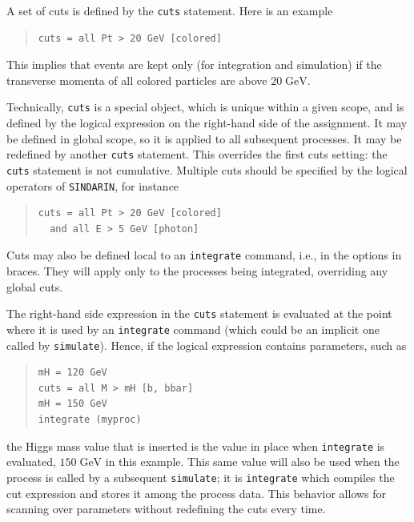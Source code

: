 \documentclass[12pt]{book}
\newcommand{\ttt}[1]{\texttt{#1}}
\newcommand{\sindarin}{\ttt{SINDARIN}}
\newcommand{\GeV}{\textrm{GeV}}
\begin{document}
A set of cuts is defined by the \ttt{cuts} statement.  Here is an example
\begin{quote}
\begin{footnotesize}
\begin{verbatim}
cuts = all Pt > 20 GeV [colored]
\end{verbatim}
\end{footnotesize}
\end{quote}
This implies that events are kept only (for integration and simulation) if the
transverse momenta of all colored particles are above $20\;\GeV$.

Technically, \ttt{cuts} is a special object, which is unique within a given
scope, and is defined by the logical expression on the right-hand side of the
assignment.  It may be defined in global scope, so it is applied to all
subsequent processes.  It may be redefined by another \ttt{cuts} statement.
This overrides the first cuts setting: the \ttt{cuts} statement is not
cumulative.  Multiple cuts should be specified by the logical operators of
\sindarin, for instance
\begin{quote}
\begin{footnotesize}
\begin{verbatim}
cuts = all Pt > 20 GeV [colored]
  and all E > 5 GeV [photon]
\end{verbatim}
\end{footnotesize}
\end{quote}
Cuts may also be defined local to an \ttt{integrate} command, i.e., in the
options in braces.   They will apply only to the processes being integrated,
overriding any global cuts.

The right-hand side expression in the \ttt{cuts} statement is evaluated at the
point where it is used by an \ttt{integrate} command (which could be an
implicit one called by \ttt{simulate}).  Hence, if the logical expression
contains parameters, such as
\begin{quote}
\begin{footnotesize}
\begin{verbatim}
mH = 120 GeV
cuts = all M > mH [b, bbar]
mH = 150 GeV
integrate (myproc)
\end{verbatim}
\end{footnotesize}
\end{quote}
the Higgs mass value that is inserted is the value in place when
\ttt{integrate} is evaluated, $150\;\GeV$ in this example.  This same value
will also be used when the process is called by a subsequent \ttt{simulate};
it is \ttt{integrate} which compiles the cut expression and stores it among
the process data.  This behavior allows for scanning over parameters without
redefining the cuts every time.
\end{document}
